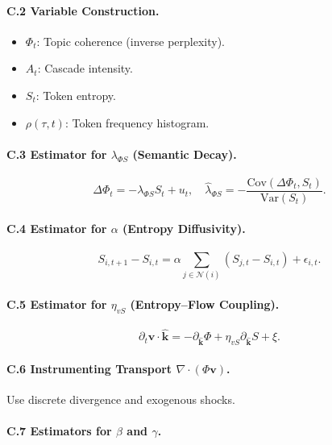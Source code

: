 \documentclass[12pt]{article}
\begin{document}
\paragraph{C.2 Variable Construction.}

\begin{itemize}
  \item \(\Phi_t\): Topic coherence (inverse perplexity).
  \item \(A_t\): Cascade intensity.
  \item \(S_t\): Token entropy.
  \item \(\rho(\tau, t)\): Token frequency histogram.
\end{itemize}

\paragraph{C.3 Estimator for \(\lambda_{\Phi S}\) (Semantic Decay).}

\[
\Delta \Phi_t = -\lambda_{\Phi S} S_t + u_t, \quad \widehat{\lambda}_{\Phi S} = -\frac{\text{Cov}(\Delta \Phi_t, S_t)}{\text{Var}(S_t)}.
\]

\paragraph{C.4 Estimator for \(\alpha\) (Entropy Diffusivity).}

\[
S_{i,t+1} - S_{i,t} = \alpha \sum_{j \in \mathcal{N}(i)} (S_{j,t} - S_{i,t}) + \epsilon_{i,t}.
\]

\paragraph{C.5 Estimator for \(\eta_{vS}\) (Entropy–Flow Coupling).}

\[
\partial_t \mathbf{v} \cdot \hat{\mathbf{k}} = -\partial_{\hat{\mathbf{k}}} \Phi + \eta_{vS} \partial_{\hat{\mathbf{k}}} S + \xi.
\]

\paragraph{C.6 Instrumenting Transport \(\nabla \cdot (\Phi \mathbf{v})\).}

Use discrete divergence and exogenous shocks.

\paragraph{C.7 Estimators for \(\beta\) and \(\gamma\).}
\end{document}
